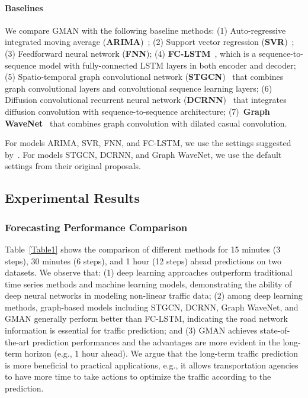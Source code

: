 \documentclass[letterpaper]{article} \usepackage{aaai20}  \usepackage{times}  \usepackage{helvet} \usepackage{courier}  \usepackage[hyphens]{url}  \usepackage{graphicx} \usepackage{amsmath}
\begin{document}
\paragraph{Baselines}

We compare GMAN with the following baseline methods: (1) Auto-regressive integrated moving average (\textbf{ARIMA})~\cite{ARIMA:1997}; (2) Support vector regression (\textbf{SVR})~\cite{Wu-et-al:TITS2004}; (3) Feedforward neural network (\textbf{FNN}); (4) \textbf{FC-LSTM}~\cite{Sutskever-et-al:NIPS2014}, which is a sequence-to-sequence model with fully-connected LSTM layers in both encoder and decoder; (5) Spatio-temporal graph convolutional network (\textbf{STGCN})~\cite{Yu-et-al:IJCAI2018} that combines graph convolutional layers and convolutional sequence learning layers; (6) Diffusion convolutional recurrent neural network (\textbf{DCRNN})~\cite{Li-et-al:ICLR2018} that integrates diffusion convolution with sequence-to-sequence architecture; (7)~\textbf{Graph WaveNet}~\cite{Wu-et-al:IJCAI2019} that combines graph convolution with dilated casual convolution.

For models ARIMA, SVR, FNN, and FC-LSTM, we use the settings suggested by~\cite{Li-et-al:ICLR2018}. For models STGCN, DCRNN, and Graph WaveNet, we use the default settings from their original proposals.

\subsection{Experimental Results}

\subsubsection{Forecasting Performance Comparison}

Table~\ref{Table1} shows the comparison of different methods for 15 minutes (3 steps), 30 minutes (6 steps), and 1 hour (12 steps) ahead predictions on two datasets. We observe that: (1) deep learning approaches outperform traditional time series methods and machine learning models, demonstrating the ability of deep neural networks in modeling non-linear traffic data; (2) among deep learning methods, graph-based models including STGCN, DCRNN, Graph WaveNet, and GMAN generally perform better than FC-LSTM, indicating the road network information is essential for traffic prediction; and (3) GMAN achieves state-of-the-art prediction performances and the advantages are more evident in the long-term horizon (e.g., 1 hour ahead). We argue that the long-term traffic prediction is more beneficial to practical applications, e.g., it allows transportation agencies to have more time to take actions to optimize the traffic according to the prediction.
\end{document}

